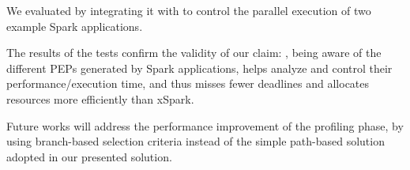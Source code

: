 We evaluated  \dSymb by integrating it with \cSpark to control the parallel execution of two example Spark applications. 



The results of the tests confirm the validity of our claim: \tool, being aware of the different PEPs generated by Spark applications, helps analyze and control their performance/execution time, and thus misses fewer deadlines and allocates resources more efficiently than xSpark.

Future works will address the performance improvement of the profiling phase, by using branch-based selection criteria instead of the simple path-based solution adopted in our presented solution.


